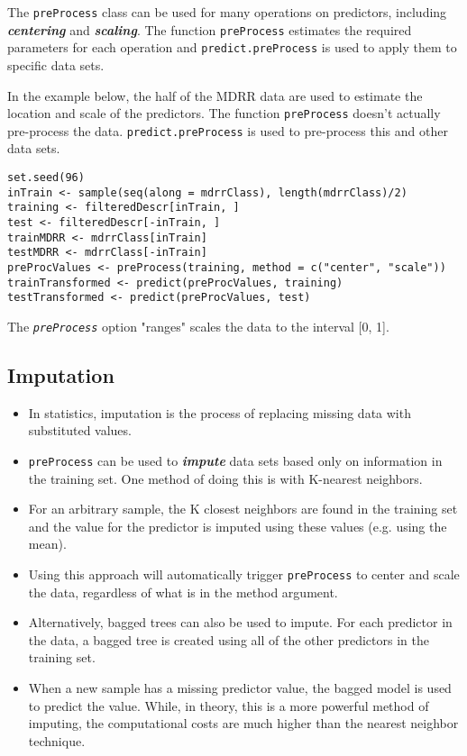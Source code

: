 \documentclass[caret-main.tex]{subfiles}
\begin{document}
The \texttt{preProcess} class can be used for many operations on predictors, including \textbf{\textit{centering}} and \textbf{\textit{scaling}}. The function \texttt{preProcess} estimates the required parameters for each operation and \texttt{predict.preProcess} is used to apply them to specific data sets.

In the example below, the half of the MDRR data are used to estimate the location and scale of the predictors. The function \texttt{preProcess} doesn't actually pre-process the data. \texttt{predict.preProcess} is used to pre-process this and other data sets.

\begin{verbatim}
set.seed(96)
inTrain <- sample(seq(along = mdrrClass), length(mdrrClass)/2)
training <- filteredDescr[inTrain, ]
test <- filteredDescr[-inTrain, ]
trainMDRR <- mdrrClass[inTrain]
testMDRR <- mdrrClass[-inTrain]
preProcValues <- preProcess(training, method = c("center", "scale"))
trainTransformed <- predict(preProcValues, training)
testTransformed <- predict(preProcValues, test)
\end{verbatim}
The \texttt{\textit{preProcess}} option "ranges" scales the data to the interval [0, 1].

\newpage
\subsection{Imputation}

\begin{itemize}
\item In statistics, imputation is the process of replacing missing data with substituted values.
\item \texttt{preProcess} can be used to \textbf{\textit{impute}} data sets based only on information in the training set. One method of doing this is with K-nearest neighbors. 
\item For an arbitrary sample, the K closest neighbors are found in the training set and the value for the predictor is imputed using these values (e.g. using the mean). 
\item Using this approach will automatically trigger \texttt{preProcess} to center and scale the data, regardless of what is in the method argument. 
\item Alternatively, bagged trees can also be used to impute. For each predictor in the data, a bagged tree is created using all of the other predictors in the training set. 
\item When a new sample has a missing predictor value, the bagged model is used to predict the value. While, in theory, this is a more powerful method of imputing, the computational costs are much higher than the nearest neighbor technique.
\end{itemize}
\end{document}
